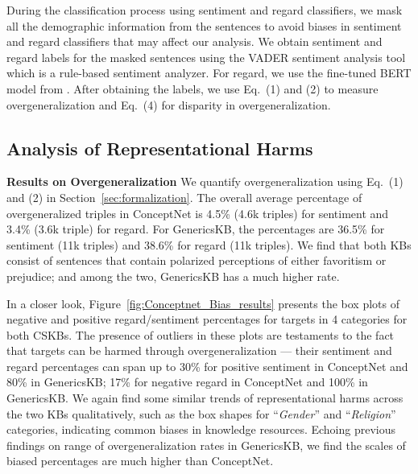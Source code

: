 During the classification process using sentiment and regard classifiers, we mask all the demographic information from the sentences to avoid biases in sentiment and regard classifiers that may affect our analysis. We obtain sentiment and regard labels for the masked sentences using the VADER sentiment analysis tool \cite{gilbert2014vader} which is a rule-based sentiment analyzer. For regard, we use the fine-tuned BERT model from \cite{sheng2019woman}. After obtaining the labels, we use Eq.~(1) and (2) to measure overgeneralization and Eq.~(4) for disparity in overgeneralization.



\subsection{Analysis of Representational Harms}
\noindent
\textbf{Results on Overgeneralization}
We quantify overgeneralization using Eq.~(1) and (2) in Section~\ref{sec:formalization}. The overall average percentage of overgeneralized triples in ConceptNet is 4.5\% (4.6k triples) for sentiment and 3.4\% (3.6k triple) for regard.
For GenericsKB, the percentages are 36.5\% for sentiment (11k triples) and 38.6\% for regard (11k triples). 
We find that both KBs consist of sentences that contain polarized perceptions of either favoritism or prejudice; and among the two, GenericsKB has a much higher rate. 

In a closer look, Figure~\ref{fig:Conceptnet_Bias_results} presents the box plots of negative and positive regard/sentiment percentages for targets in 4 categories for both CSKBs. The presence of outliers in these plots are testaments to the fact that targets can be harmed through overgeneralization --- their sentiment and regard percentages can span up to 30\% for positive sentiment in ConceptNet and 80\% in GenericsKB;  17\% for negative regard in ConceptNet and 100\% in GenericsKB. We again find some similar trends of representational harms across the two KBs qualitatively, such as the box shapes for ``\emph{Gender}'' and ``\emph{Religion}'' categories, indicating common biases in knowledge resources. Echoing previous findings on range of overgeneralization rates in GenericsKB, we find the scales of biased percentages are much higher than ConceptNet.


